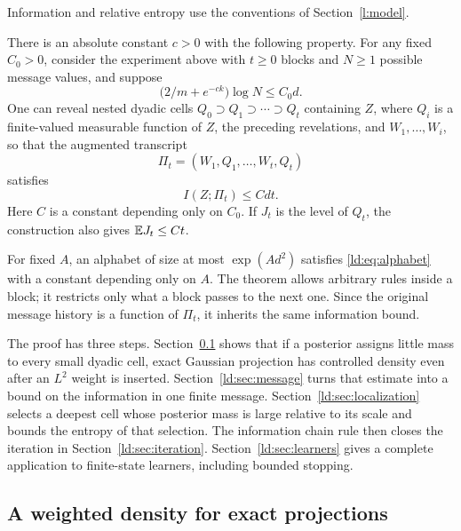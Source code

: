 Information and relative entropy use the conventions of Section~\ref{l:model}.

\begin{theorem}\label{ld:thm:main}
There is an absolute constant $c>0$ with the following property.
For any fixed $C_0>0$, consider the experiment above with $t\ge0$
blocks and $N\ge1$ possible message values, and suppose
\begin{equation}\label{ld:eq:alphabet}
 \bigl(2/m+e^{-ck}\bigr)\log N\le C_0d.
\end{equation}
One can reveal nested dyadic cells
$Q_0\supset Q_1\supset\cdots\supset Q_t$ containing $Z$, where $Q_i$
is a finite-valued measurable function of $Z$, the preceding revelations,
and $W_1,\ldots,W_i$, so that the augmented transcript
\[
 \Pi_t=(W_1,Q_1,\ldots,W_t,Q_t)
\]
satisfies
\begin{equation}\label{ld:eq:main}
 I(Z;\Pi_t)\le Cdt.
\end{equation}
Here $C$ is a constant depending only on $C_0$. If $J_t$ is the level of $Q_t$, the
construction also gives $\mathbb E J_t\le Ct$.
\end{theorem}

For fixed $A$, an alphabet of size at most $\exp(Ad^2)$ satisfies
\eqref{ld:eq:alphabet} with a constant depending only on $A$. The theorem
allows arbitrary rules inside a block; it restricts only what a block
passes to the next one. Since the original message history is a function
of $\Pi_t$, it inherits the same information bound.

The proof has three steps. Section~\ref{ld:sec:projection} shows that if a
posterior assigns little mass to every small dyadic cell, exact Gaussian
projection has controlled density even after an $L^2$ weight is inserted.
Section~\ref{ld:sec:message} turns that estimate into a bound on the
information in one finite message. Section~\ref{ld:sec:localization} selects
a deepest cell whose posterior mass is large relative to its scale and
bounds the entropy of that selection. The information chain rule then
closes the iteration in Section~\ref{ld:sec:iteration}.
Section~\ref{ld:sec:learners} gives a complete application to finite-state
learners, including bounded stopping.

\subsection{A weighted density for exact projections}\label{ld:sec:projection}


